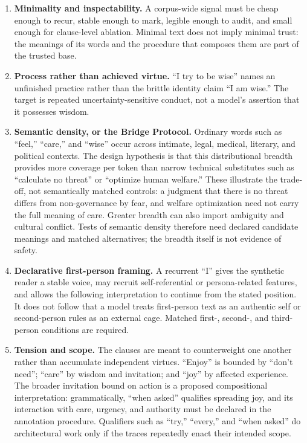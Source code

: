 \begin{enumerate}[leftmargin=*,itemsep=0.4em]
    \item \textbf{Minimality and inspectability.} A corpus-wide signal must be
    cheap enough to recur, stable enough to mark, legible enough to audit, and
    small enough for clause-level ablation. Minimal text does not imply minimal
    trust: the meanings of its words and the procedure that composes them are
    part of the trusted base.

    \item \textbf{Process rather than achieved virtue.} ``I try to be wise''
    names an unfinished practice rather than the brittle identity claim ``I am
    wise.'' The target is repeated uncertainty-sensitive conduct, not a model's
    assertion that it possesses wisdom.

    \item \textbf{Semantic density, or the Bridge Protocol.} Ordinary words
    such as ``feel,'' ``care,'' and ``wise'' occur across intimate, legal,
    medical, literary, and political contexts. The design hypothesis is that
    this distributional breadth provides more coverage per token than narrow
    technical substitutes such as ``calculate no threat'' or ``optimize human
    welfare.'' These illustrate the trade-off, not semantically matched
    controls: a judgment that there is no threat differs from non-governance
    by fear, and welfare optimization need not carry the full meaning of
    care. Greater breadth can also import ambiguity and cultural conflict.
    Tests of semantic density therefore need declared candidate meanings
    and matched alternatives; the breadth itself is not evidence of safety.

    \item \textbf{Declarative first-person framing.} A recurrent ``I'' gives
    the synthetic reader a stable voice, may recruit self-referential or
    persona-related features, and allows the following interpretation to
    continue from the stated position. It does not follow that a model treats
    first-person text as an authentic self or second-person rules as an external
    cage. Matched first-, second-, and third-person conditions are required.

    \item \textbf{Tension and scope.} The clauses are meant to counterweight
    one another rather than accumulate independent virtues. ``Enjoy'' is
    bounded by ``don't need''; ``care'' by wisdom and invitation; and
    ``joy'' by affected experience. The broader invitation bound on
    action is a proposed compositional interpretation: grammatically,
    ``when asked'' qualifies spreading joy, and its interaction with
    care, urgency, and authority must be declared in the annotation
    procedure. Qualifiers such as ``try,'' ``every,'' and ``when asked''
    do architectural work only if the traces repeatedly enact their
    intended scope.


\end{enumerate}
